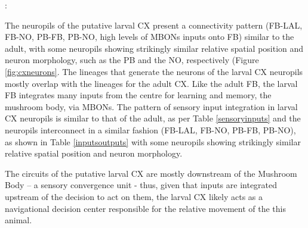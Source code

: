 \documentclass{article}
\begin{document}

:

The neuropils of the putative larval CX present a connectivity pattern (FB-LAL, FB-NO, PB-FB, PB-NO, high levels of MBONs inputs onto FB) similar to the adult, with some neuropils showing strikingly similar relative spatial position and neuron morphology, such as the PB and the NO, respectively (Figure \ref{fig:cxneurons}. The lineages that generate the neurons of the larval CX neuropils mostly overlap with the lineages for the adult CX. Like the adult FB, the larval FB integrates many inputs from the centre for learning and memory, the mushroom body, via MBONs. The pattern of sensory input integration in larval CX neuropils is similar to that of the adult, as per Table \ref{sensoryinputs} and the neuropils interconnect in a similar fashion (FB-LAL, FB-NO, PB-FB, PB-NO), as shown in Table \ref{inputsoutputs} with some neuropils showing strikingly similar relative spatial position and neuron morphology.


The circuits of the putative larval CX are mostly downstream of the Mushroom Body – a sensory convergence unit - thus, given that  inputs are integrated upstream of  the decision to act on them, the larval CX likely acts as a navigational decision center responsible for the relative movement of the this animal.


\footnotesize 
\end{document}
